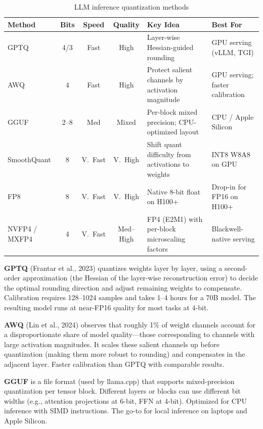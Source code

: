 \begin{table}[H]
\centering
\caption{LLM inference quantization methods}
\begin{tabularx}{\textwidth}{lcccXX}
\toprule
\textbf{Method} & \textbf{Bits} & \textbf{Speed} & \textbf{Quality} & \textbf{Key Idea} & \textbf{Best For} \\
\midrule
GPTQ & 4/3 & Fast & High & Layer-wise Hessian-guided rounding & GPU serving (vLLM, TGI) \\
AWQ & 4 & Fast & High & Protect salient channels by activation magnitude & GPU serving; faster calibration \\
GGUF & 2--8 & Med & Mixed & Per-block mixed precision; CPU-optimized layout & CPU / Apple Silicon \\
SmoothQuant & 8 & V.\ Fast & V.\ High & Shift quant difficulty from activations to weights & INT8 W8A8 on GPU \\
FP8 & 8 & V.\ Fast & V.\ High & Native 8-bit float on H100+ & Drop-in for FP16 on H100+ \\
NVFP4 / MXFP4 & 4 & V.\ Fast & Med--High & FP4 (E2M1) with per-block microscaling factors & Blackwell-native serving \\
\bottomrule
\end{tabularx}
\end{table}

\textbf{GPTQ} (Frantar et al., 2023) quantizes weights layer by layer, using a second-order approximation (the Hessian of the layer-wise reconstruction error) to decide the optimal rounding direction and adjust remaining weights to compensate. Calibration requires 128--1024 samples and takes 1--4 hours for a 70B model. The resulting model runs at near-FP16 quality for most tasks at 4-bit.

\textbf{AWQ} (Lin et al., 2024) observes that roughly 1\% of weight channels account for a disproportionate share of model quality---those corresponding to channels with large activation magnitudes. It scales these salient channels up before quantization (making them more robust to rounding) and compensates in the adjacent layer. Faster calibration than GPTQ with comparable results.

\textbf{GGUF} is a file format (used by llama.cpp) that supports mixed-precision quantization per tensor block. Different layers or blocks can use different bit widths (e.g., attention projections at 6-bit, FFN at 4-bit). Optimized for CPU inference with SIMD instructions. The go-to for local inference on laptops and Apple Silicon.

